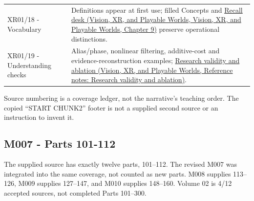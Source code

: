 {\begin{longtable}[]{@{}
  >{\raggedright\arraybackslash}p{}
  >{\raggedright\arraybackslash}p{}@{}}
XR01/18 - Vocabulary & Definitions appear at first use; filled Concepts and \href{../07-Vision-XR-and-Playable-Worlds/main.pdf\#nameddest=04-visual-computing-ii-ch042-teach-the-distinctions-from-a-blank-board}{Recall desk (Vision, XR, and Playable Worlds, Vision, XR, and Playable Worlds, Chapter 9)} preserve operational distinctions. \\
XR01/19 - Understanding checks & Alias/phase, nonlinear filtering, additive-cost and evidence-reconstruction examples; \href{../07-Vision-XR-and-Playable-Worlds/main.pdf\#nameddest=appendix-65788587ef78}{Research validity and ablation (Vision, XR, and Playable Worlds, Reference notes: Research validity and ablation)}. \\
\end{longtable}
}

Source numbering is a coverage ledger, not the narrative's teaching order. The copied ``START CHUNK2'' footer is not a supplied second source or an instruction to invent it.

\subsection{M007 - Parts 101-112}\label{appendix-fd090d982a15-m007---parts-101-112}

The supplied source has exactly twelve parts, 101--112. The revised M007 was integrated into the same coverage, not counted as new parts. M008 supplies 113--126, M009 supplies 127--147, and M010 supplies 148--160. Volume 02 is 4/12 accepted sources, not completed Parts 101--300.

